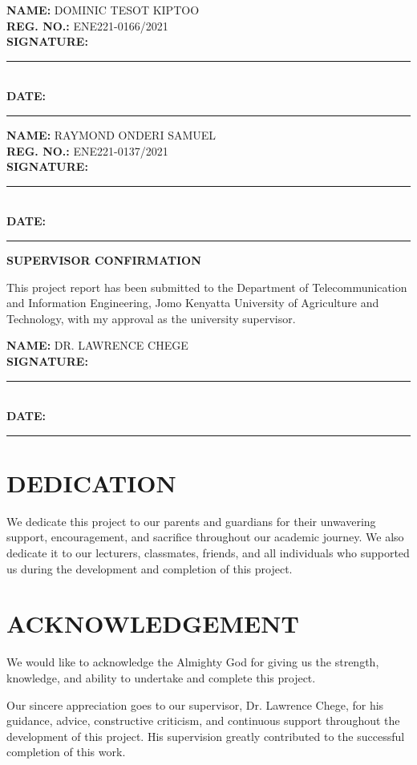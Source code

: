 \documentclass[12pt,a4paper]{report}
\begin{document}
\vspace{0.8cm}
\textbf{NAME:} DOMINIC TESOT KIPTOO\\
\textbf{REG. NO.:} ENE221-0166/2021\\
\textbf{SIGNATURE:} \rule{6cm}{0.4pt}\\
\textbf{DATE:} \rule{6cm}{0.4pt}

\vspace{0.8cm}
\textbf{NAME:} RAYMOND ONDERI SAMUEL\\
\textbf{REG. NO.:} ENE221-0137/2021\\
\textbf{SIGNATURE:} \rule{6cm}{0.4pt}\\
\textbf{DATE:} \rule{6cm}{0.4pt}

\vspace{1.0cm}
\textbf{SUPERVISOR CONFIRMATION}

This project report has been submitted to the Department of Telecommunication and Information Engineering, Jomo Kenyatta University of Agriculture and Technology, with my approval as the university supervisor.

\vspace{0.6cm}
\textbf{NAME:} DR. LAWRENCE CHEGE\\
\textbf{SIGNATURE:} \rule{6cm}{0.4pt}\\
\textbf{DATE:} \rule{6cm}{0.4pt}

\chapter*{DEDICATION}
We dedicate this project to our parents and guardians for their unwavering support, encouragement, and sacrifice throughout our academic journey. We also dedicate it to our lecturers, classmates, friends, and all individuals who supported us during the development and completion of this project.

\chapter*{ACKNOWLEDGEMENT}
We would like to acknowledge the Almighty God for giving us the strength, knowledge, and ability to undertake and complete this project.

Our sincere appreciation goes to our supervisor, Dr. Lawrence Chege, for his guidance, advice, constructive criticism, and continuous support throughout the development of this project. His supervision greatly contributed to the successful completion of this work.
\end{document}

